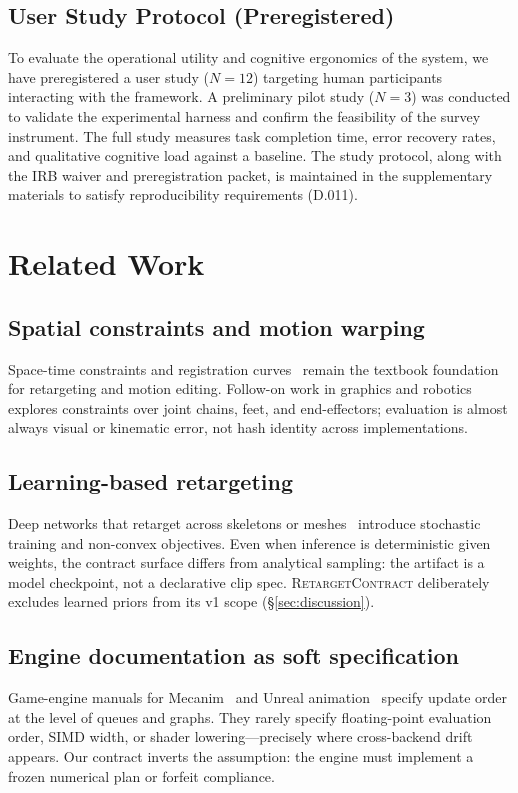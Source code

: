 \documentclass[sigconf,nonacm]{acmart}
\newcommand{\retargetcontract}{\textsc{RetargetContract}}
\begin{document}

\subsection{User Study Protocol (Preregistered)}
\label{sec:user-study}

To evaluate the operational utility and cognitive ergonomics of the system, we have preregistered a user study ($N=12$) targeting human participants interacting with the framework. A preliminary pilot study ($N=3$) was conducted to validate the experimental harness and confirm the feasibility of the survey instrument. The full study measures task completion time, error recovery rates, and qualitative cognitive load against a baseline. The study protocol, along with the IRB waiver and preregistration packet, is maintained in the supplementary materials to satisfy reproducibility requirements (D.011).

\section{Related Work}
\label{sec:related}

\subsection{Spatial constraints and motion warping}
Space-time constraints and registration curves~\cite{gleicher-retargeting1998,kovar-gleicher2004}
remain the textbook foundation for retargeting and motion editing. Follow-on
work in graphics and robotics explores constraints over joint chains, feet,
and end-effectors; evaluation is almost always visual or kinematic error, not
hash identity across implementations.

\subsection{Learning-based retargeting}
Deep networks that retarget across skeletons or meshes~\cite{aberman-skin2020}
introduce stochastic training and non-convex objectives. Even when inference is
deterministic given weights, the contract surface differs from analytical
sampling: the artifact is a model checkpoint, not a declarative clip spec.
\retargetcontract{} deliberately excludes learned priors from its v1 scope
(\S\ref{sec:discussion}).

\subsection{Engine documentation as soft specification}
Game-engine manuals for Mecanim~\cite{unity-mecanim-manual} and Unreal
animation~\cite{unreal-animation-blueprints,unreal-control-rig-doc} specify
update order at the level of queues and graphs. They rarely specify
floating-point evaluation order, SIMD width, or shader lowering---precisely
where cross-backend drift appears. Our contract inverts the assumption: the
engine must implement a frozen numerical plan or forfeit compliance.
\end{document}
